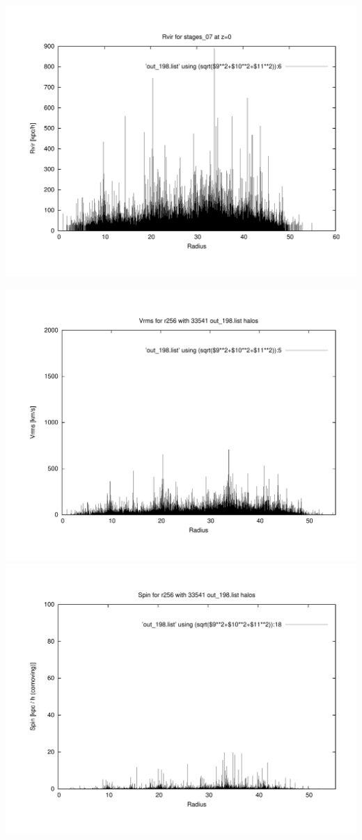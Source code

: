 \includegraphics[scale=0.3]{r256/h100/stages_07/plot_rvir_z0.pdf}

\includegraphics[scale=0.3]{r256/h100/stages_07/plot_Vrms_out_198.pdf}
\includegraphics[scale=0.3]{r256/h100/stages_07/plot_spin_out_198.pdf}


